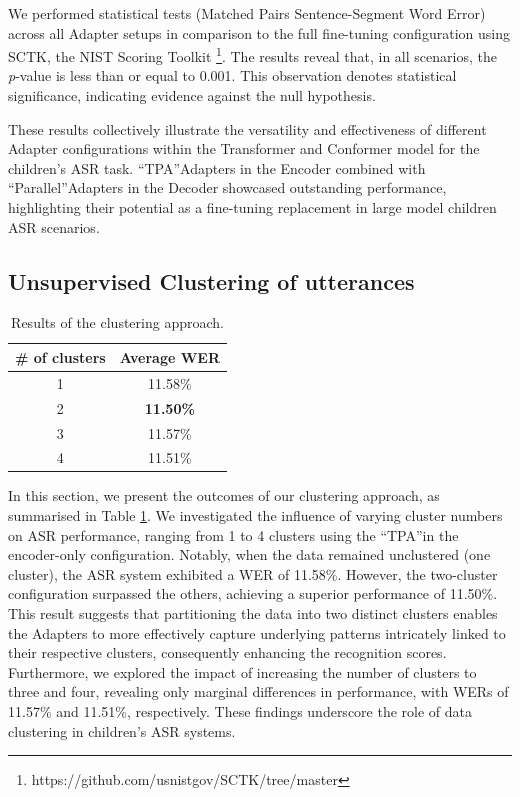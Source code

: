 We performed statistical tests (Matched Pairs Sentence-Segment Word Error) across all Adapter setups in comparison to the full fine-tuning configuration using SCTK, the NIST Scoring Toolkit \footnote{https://github.com/usnistgov/SCTK/tree/master}. 
The results reveal that, in all scenarios, the \textit{p}-value is less than or equal to 0.001. This observation denotes statistical significance, indicating evidence against the null hypothesis. 

These results collectively illustrate the versatility and effectiveness of different Adapter configurations within the Transformer and  Conformer model for the children's ASR task. ``TPA''Adapters in the Encoder combined with ``Parallel''Adapters in the Decoder showcased outstanding performance, highlighting their potential as a fine-tuning replacement in large model children ASR scenarios.

\subsection{Unsupervised Clustering of utterances}
\begin{table}[t]
\caption{Results of the clustering approach.}
\begin{center}    
\begin{tabular}{cc}
\hline
  \# of clusters & Average WER     \\ \hline
\multicolumn{1}{c}{1} & 11.58\%  \\%
\multicolumn{1}{c}{2} & \textbf{11.50\%}  \\
\multicolumn{1}{c}{3} & 11.57\%  \\
\multicolumn{1}{c}{4} & 11.51\%  \\ \hline 

\end{tabular}
\end{center}

\label{tab:res_clusters}
\end{table}



In this section, we present the outcomes of our clustering approach, as summarised in Table \ref{tab:res_clusters}. We investigated the influence of varying cluster numbers on ASR performance, ranging from 1 to 4 clusters using the ``TPA''in the encoder-only configuration. Notably, when the data remained unclustered (one cluster), the ASR system exhibited a WER of 11.58\%. However, the two-cluster configuration surpassed the others, achieving a superior performance of 11.50\%. This result suggests that partitioning the data into two distinct clusters enables the Adapters to more effectively capture underlying patterns intricately linked to their respective clusters, consequently enhancing the recognition scores. Furthermore, we explored the impact of increasing the number of clusters to three and four, revealing only marginal differences in performance, with WERs of 11.57\% and 11.51\%, respectively. These findings underscore the role of data clustering in children's ASR systems.

